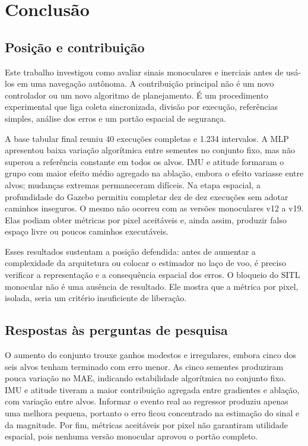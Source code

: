 \chapter{Conclusão}\label{cap:conclusoes}

\section{Posição e contribuição}

Este trabalho investigou como avaliar sinais monoculares e inerciais antes de usá-los em uma navegação autônoma. A contribuição principal não é um novo controlador ou um novo algoritmo de planejamento. É um procedimento experimental que liga coleta sincronizada, divisão por execução, referências simples, análise dos erros e um portão espacial de segurança.

A base tabular final reuniu 40 execuções completas e 1.234 intervalos. A MLP apresentou baixa variação algorítmica entre sementes no conjunto fixo, mas não superou a referência constante em todos os alvos. IMU e atitude formaram o grupo com maior efeito médio agregado na ablação, embora o efeito variasse entre alvos; mudanças extremas permaneceram difíceis. Na etapa espacial, a profundidade do Gazebo permitiu completar dez de dez execuções sem adotar caminhos inseguros. O mesmo não ocorreu com as versões monoculares v12 a v19. Elas podiam obter métricas por pixel aceitáveis e, ainda assim, produzir falso espaço livre ou poucos caminhos executáveis.

Esses resultados sustentam a posição defendida: antes de aumentar a complexidade da arquitetura ou colocar o estimador no laço de voo, é preciso verificar a representação e a consequência espacial dos erros. O bloqueio do SITL monocular não é uma ausência de resultado. Ele mostra que a métrica por pixel, isolada, seria um critério insuficiente de liberação.

\section{Respostas às perguntas de pesquisa}

O aumento do conjunto trouxe ganhos modestos e irregulares, embora cinco dos seis alvos tenham terminado com erro menor. As cinco sementes produziram pouca variação no MAE, indicando estabilidade algorítmica no conjunto fixo. IMU e atitude tiveram a maior contribuição agregada entre gradientes e ablação, com variação entre alvos. Informar o evento real ao regressor produziu apenas uma melhora pequena, portanto o erro ficou concentrado na estimação do sinal e da magnitude. Por fim, métricas aceitáveis por pixel não garantiram utilidade espacial, pois nenhuma versão monocular aprovou o portão completo.

